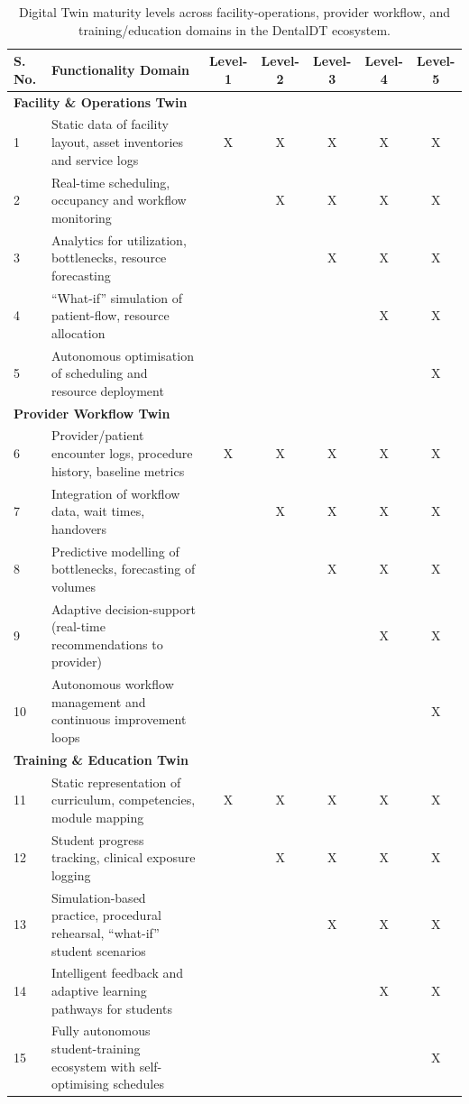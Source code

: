 \documentclass[Afour,sageh,times]{sagej}
\begin{document}
\begin{table}[h]
\small\sf\centering
\caption{Digital Twin maturity levels across facility-operations, provider workflow, and training/education domains in the DentalDT ecosystem.\label{tab:dt_maturity}}
\begin{tabular}{p{0.8cm}p{6cm}ccccc}
\toprule
\textbf{S. No.} & \textbf{Functionality Domain} & \textbf{Level-1} & \textbf{Level-2} & \textbf{Level-3} & \textbf{Level-4} & \textbf{Level-5} \\
\midrule
\multicolumn{7}{l}{\textbf{Facility \& Operations Twin}} \\
1 & Static data of facility layout, asset inventories and service logs & X & X & X & X & X \\
2 & Real-time scheduling, occupancy and workflow monitoring &  & X & X & X & X \\
3 & Analytics for utilization, bottlenecks, resource forecasting &  &  & X & X & X \\
4 & “What-if” simulation of patient-flow, resource allocation &  &  &  & X & X \\
5 & Autonomous optimisation of scheduling and resource deployment &  &  &  &  & X \\
\midrule
\multicolumn{7}{l}{\textbf{Provider Workflow Twin}} \\
6 & Provider/patient encounter logs, procedure history, baseline metrics & X & X & X & X & X \\
7 & Integration of workflow data, wait times, handovers &  & X & X & X & X \\
8 & Predictive modelling of bottlenecks, forecasting of volumes &  &  & X & X & X \\
9 & Adaptive decision-support (real-time recommendations to provider) &  &  &  & X & X \\
10 & Autonomous workflow management and continuous improvement loops &  &  &  &  & X \\
\midrule
\multicolumn{7}{l}{\textbf{Training \& Education Twin}} \\
11 & Static representation of curriculum, competencies, module mapping & X & X & X & X & X \\
12 & Student progress tracking, clinical exposure logging &  & X & X & X & X \\
13 & Simulation-based practice, procedural rehearsal, “what-if” student scenarios &  &  & X & X & X \\
14 & Intelligent feedback and adaptive learning pathways for students &  &  &  & X & X \\
15 & Fully autonomous student-training ecosystem with self-optimising schedules &  &  &  &  & X \\
\bottomrule
\end{tabular}
\end{table}
\end{document}
